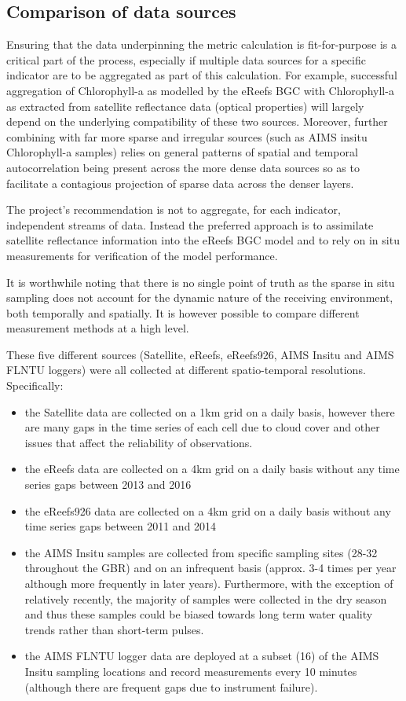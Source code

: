 \subsection{Comparison of data sources}

Ensuring that the data underpinning the metric calculation is fit-for-purpose is a critical part of
the process, especially if multiple data sources for a specific indicator are to be aggregated as
part of this calculation.  For example, successful aggregation of Chlorophyll-a as modelled by the
eReefs BGC with Chlorophyll-a as extracted from satellite reflectance data (optical properties) will
largely depend on the underlying compatibility of these two sources.  Moreover, further combining
with far more sparse and irregular sources (such as AIMS insitu Chlorophyll-a samples) relies on
general patterns of spatial and temporal autocorrelation being present across the more dense data
sources so as to facilitate a contagious projection of sparse data across the denser layers.


The project’s recommendation is not to aggregate, for each indicator, independent streams of data.
Instead the preferred approach is to assimilate satellite reflectance information into the eReefs
BGC model and to rely on in situ measurements for verification of the model performance.

It is worthwhile noting that there is no single point of truth as the sparse in situ sampling does
not account for the dynamic nature of the receiving environment, both temporally and spatially.  It
is however possible to compare different measurement methods at a high level.


These five different sources (Satellite, eReefs, eReefs926, AIMS Insitu and AIMS FLNTU loggers) were
all collected at different spatio-temporal resolutions.  Specifically:
\begin{itemize}
\item the Satellite data are collected on a 1km grid on a daily basis, however there are many gaps
in the time series of each cell due to cloud cover and other issues that affect the reliability of
observations.
\item the eReefs data are collected on a 4km grid on a daily basis without any time series gaps
between 2013 and 2016
\item the eReefs926 data are collected on a 4km grid on a daily basis without any time series gaps
between 2011 and 2014
\item the AIMS Insitu samples are collected from specific sampling sites (28-32 throughout the GBR)
and on an infrequent basis (approx. 3-4 times per year although more frequently in later years).
Furthermore, with the exception of relatively recently, the majority of samples were collected in
the dry season and thus these samples could be biased towards long term water quality trends rather
than short-term pulses.
\item the AIMS FLNTU logger data are deployed at a subset (16) of the AIMS Insitu sampling locations
and record measurements every 10 minutes (although there are frequent gaps due to instrument
failure).
\end{itemize}

